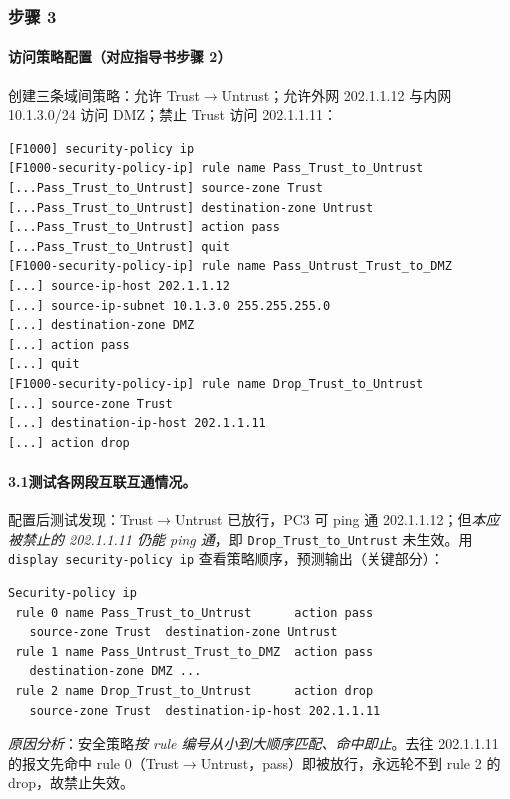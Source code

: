 \documentclass[12pt,a4paper]{article}
\begin{document}
\subsubsection*{步骤 3}
\paragraph{访问策略配置（对应指导书步骤 2）}
创建三条域间策略：允许 Trust$\to$Untrust；允许外网 202.1.1.12 与内网 10.1.3.0/24 访问 DMZ；禁止 Trust 访问 202.1.1.11：
\begin{lstlisting}
[F1000] security-policy ip
[F1000-security-policy-ip] rule name Pass_Trust_to_Untrust
[...Pass_Trust_to_Untrust] source-zone Trust
[...Pass_Trust_to_Untrust] destination-zone Untrust
[...Pass_Trust_to_Untrust] action pass
[...Pass_Trust_to_Untrust] quit
[F1000-security-policy-ip] rule name Pass_Untrust_Trust_to_DMZ
[...] source-ip-host 202.1.1.12
[...] source-ip-subnet 10.1.3.0 255.255.255.0
[...] destination-zone DMZ
[...] action pass
[...] quit
[F1000-security-policy-ip] rule name Drop_Trust_to_Untrust
[...] source-zone Trust
[...] destination-ip-host 202.1.1.11
[...] action drop
\end{lstlisting}

\paragraph{3.1\quad 测试各网段互联互通情况。}
配置后测试发现：Trust$\to$Untrust 已放行，PC3 可 ping 通 202.1.1.12；但\emph{本应被禁止的 202.1.1.11 仍能 ping 通}，即 \texttt{Drop\_Trust\_to\_Untrust} 未生效。用 \texttt{display security-policy ip} 查看策略顺序，预测输出（关键部分）：
\begin{lstlisting}[basicstyle=\ttfamily\scriptsize]
Security-policy ip
 rule 0 name Pass_Trust_to_Untrust      action pass
   source-zone Trust  destination-zone Untrust
 rule 1 name Pass_Untrust_Trust_to_DMZ  action pass
   destination-zone DMZ ...
 rule 2 name Drop_Trust_to_Untrust      action drop
   source-zone Trust  destination-ip-host 202.1.1.11
\end{lstlisting}
\emph{原因分析}：安全策略\emph{按 rule 编号从小到大顺序匹配、命中即止}。去往 202.1.1.11 的报文先命中 rule 0（Trust$\to$Untrust，pass）即被放行，永远轮不到 rule 2 的 drop，故禁止失效。
\end{document}

